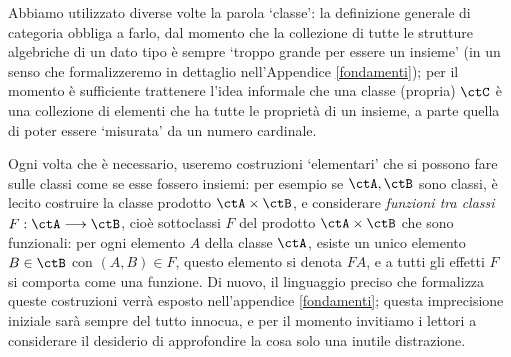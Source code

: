 Abbiamo utilizzato diverse volte la parola `classe': la definizione generale di categoria obbliga a farlo, dal momento che la collezione di tutte le strutture algebriche di un dato tipo è sempre `troppo grande per essere un insieme' (in un senso che formalizzeremo in dettaglio nell'Appendice \ref{fondamenti}); per il momento è sufficiente trattenere l'idea informale che una classe (propria) $\ctC$ è una collezione di elementi che ha tutte le proprietà di un insieme, a parte quella di poter essere `misurata' da un numero cardinale.

Ogni volta che è necessario, useremo costruzioni `elementari' che si possono fare sulle classi come se esse fossero insiemi: per esempio se $\ctA,\ctB$ sono classi, è lecito costruire la classe prodotto $\ctA\times\ctB$, e considerare \emph{funzioni tra classi} $F : \ctA\fun\ctB$, cioè sottoclassi $F$ del prodotto $\ctA\times\ctB$ che sono funzionali: per ogni elemento $A$ della classe $\ctA$, esiste un unico elemento $B\in\ctB$ con $(A,B)\in F$, questo elemento si denota $FA$, e a tutti gli effetti $F$ si comporta come una funzione. Di nuovo, il linguaggio preciso che formalizza queste costruzioni verrà esposto nell'appendice \ref{fondamenti}; questa imprecisione iniziale sarà sempre del tutto innocua, e per il momento invitiamo i lettori a considerare il desiderio di approfondire la cosa solo una inutile distrazione.
